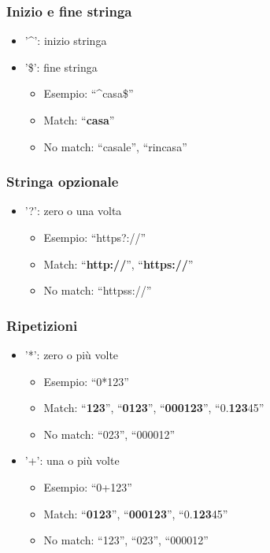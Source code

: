 \documentclass[xetex,table]{beamer}
\begin{document}
\begin{frame}
  \frametitle{Inizio e fine stringa}
  \begin{itemize}
  \item '\^{}': inizio stringa
  \item '\${}': fine stringa
    \begin{itemize}
    \item Esempio: ``\^{}casa\${}''
    \item Match: ``{\bf casa}''
    \item No match: ``casale'', ``rincasa''
    \end{itemize}
  \end{itemize}
\end{frame}

\begin{frame}
  \frametitle{Stringa opzionale}
  \begin{itemize}
  \item '?': zero o una volta
    \begin{itemize}
    \item Esempio: ``https?://''
    \item Match: ``{\bf http://}'', ``{\bf https://}''
    \item No match: ``httpss://''
    \end{itemize}
  \end{itemize}
\end{frame}

\begin{frame}
  \frametitle{Ripetizioni}
  \begin{itemize}
  \item '*': zero o più volte
    \begin{itemize}
    \item Esempio: ``0*123''
    \item Match: ``{\bf 123}'', ``{\bf 0123}'', ``{\bf 000123}'', ``0.{\bf 123}45''
    \item No match: ``023'', ``000012''
    \end{itemize}
  \item '+': una o più volte
    \begin{itemize}
    \item Esempio: ``0+123''
    \item Match: ``{\bf 0123}'', ``{\bf 000123}'', ``0.{\bf 123}45''
    \item No match: ``123'', ``023'', ``000012''
    \end{itemize}
  \end{itemize}
\end{frame}
\end{document}
